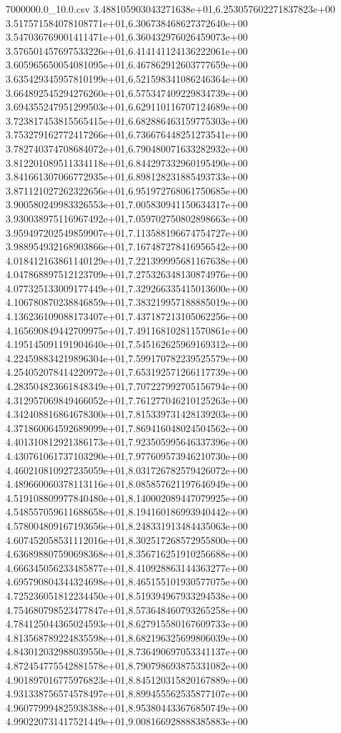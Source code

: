 \begin{filecontents*}{7000000.0_10.0.csv}
3.488105903043271638e+01,6.253057602271837823e+00
3.517571584078108771e+01,6.306738468627372640e+00
3.547036769001411471e+01,6.360432976026459073e+00
3.576501457697533226e+01,6.414141124136222061e+00
3.605965650054081095e+01,6.467862912603777659e+00
3.635429345957810199e+01,6.521598341086246364e+00
3.664892545294276260e+01,6.575347409229834739e+00
3.694355247951299503e+01,6.629110116707124689e+00
3.723817453815565415e+01,6.682886463159775303e+00
3.753279162772417266e+01,6.736676448251273541e+00
3.782740374708684072e+01,6.790480071633282932e+00
3.812201089511334118e+01,6.844297332960195490e+00
3.841661307066772935e+01,6.898128231885493733e+00
3.871121027262322656e+01,6.951972768061750685e+00
3.900580249983326553e+01,7.005830941150634317e+00
3.930038975116967492e+01,7.059702750802898663e+00
3.959497202549859907e+01,7.113588196674754727e+00
3.988954932168903866e+01,7.167487278416956542e+00
4.018412163861140129e+01,7.221399995681167638e+00
4.047868897512123709e+01,7.275326348130874976e+00
4.077325133009177449e+01,7.329266335415013600e+00
4.106780870238846859e+01,7.383219957188885019e+00
4.136236109088173407e+01,7.437187213105062256e+00
4.165690849442709975e+01,7.491168102811570861e+00
4.195145091191904640e+01,7.545162625969169312e+00
4.224598834219896304e+01,7.599170782239525579e+00
4.254052078414220972e+01,7.653192571266117739e+00
4.283504823661848349e+01,7.707227992705156794e+00
4.312957069849466052e+01,7.761277046210125263e+00
4.342408816864678300e+01,7.815339731428139203e+00
4.371860064592689099e+01,7.869416048024504562e+00
4.401310812921386173e+01,7.923505995646337396e+00
4.430761061737103290e+01,7.977609573946210730e+00
4.460210810927235059e+01,8.031726782579426072e+00
4.489660060378113116e+01,8.085857621197646949e+00
4.519108809977840480e+01,8.140002089447079925e+00
4.548557059611688658e+01,8.194160186993940442e+00
4.578004809167193656e+01,8.248331913484435063e+00
4.607452058531112016e+01,8.302517268572955800e+00
4.636898807590698368e+01,8.356716251910256688e+00
4.666345056233485877e+01,8.410928863144363277e+00
4.695790804344324698e+01,8.465155101930577075e+00
4.725236051812234450e+01,8.519394967933294538e+00
4.754680798523477847e+01,8.573648460793265258e+00
4.784125044365024593e+01,8.627915580167609733e+00
4.813568789224835598e+01,8.682196325699806039e+00
4.843012032988039550e+01,8.736490697053341137e+00
4.872454775542881578e+01,8.790798693875331082e+00
4.901897016775976823e+01,8.845120315820167889e+00
4.931338756574578497e+01,8.899455562535877107e+00
4.960779994825938388e+01,8.953804433676850749e+00
4.990220731417521449e+01,9.008166928888385883e+00

\end{filecontents*}

